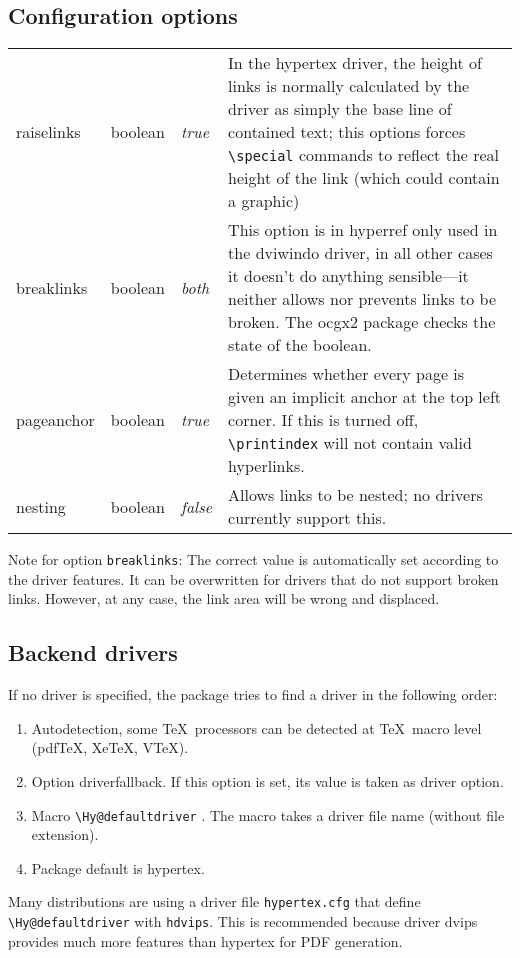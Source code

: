 \documentclass{article}
\newcommand*{\cs}[1]{%
  \texttt{\textbackslash #1}%
}
\newcommand*{\xpackage}[1]{\textsf{#1}}
\begin{document}
       

\subsection{Configuration options}

\begin{longtable}{>{\ttfamily}ll>{\itshape}lp{9cm}}
raiselinks & boolean & true  & In the hypertex driver, the height of links is normally calculated by the driver as
                               simply the base line of contained text; this options forces \verb|\special| commands to
                               reflect the real height of the link (which could contain a graphic) \\
breaklinks & boolean & both & This option is in \xpackage{hyperref} only used in the dviwindo driver, in all other cases it doesn't do anything sensible---it neither allows nor prevents links to be broken. The ocgx2 package
checks the state of the boolean.\\
pageanchor & boolean & true  & Determines whether every page is given an implicit anchor at the top left corner. If this
                               is turned off, \verb|\printindex| will not contain
                               valid hyperlinks. \\
nesting    & boolean & false & Allows links to be nested; no drivers currently support this.
\end{longtable}

Note for option \verb|breaklinks|:
The correct value is automatically set according to the driver features.
It can be overwritten for drivers that do not support broken links.
However, at any case, the link area will be wrong and displaced.

\subsection{Backend drivers}

If no driver is specified, the package tries to find a driver in
the following order:
\begin{enumerate}
\item Autodetection, some \TeX\ processors can be detected at \TeX\ macro
  level (pdf\TeX, Xe\TeX, V\TeX).
\item Option \textsf{driverfallback}. If this option is set, its value
  is taken as driver option.
\item Macro \cs{Hy@defaultdriver}. The macro takes a driver file
  name (without file extension).
\item Package default is \textsf{hypertex}.
\end{enumerate}
Many distributions are using a driver file \texttt{hypertex.cfg} that
define \cs{Hy@defaultdriver} with \texttt{hdvips}. This is recommended
because driver \textsf{dvips} provides much more features than
\textsf{hypertex} for PDF generation.
\end{document}
